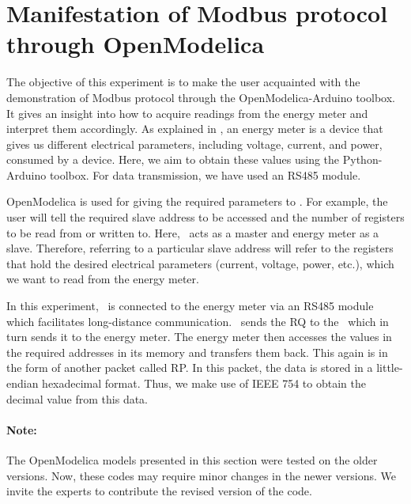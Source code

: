 
\section{Manifestation of Modbus protocol through OpenModelica}
The objective of this experiment is to make the user acquainted with
the demonstration of Modbus protocol through the OpenModelica-Arduino toolbox.
It gives an insight into how to acquire readings from the energy meter and interpret them accordingly. As explained in ,
an energy meter is a device that gives us different electrical parameters, including voltage, current, and power, consumed by a device. Here, we aim to obtain these values using the Python-Arduino toolbox. For data transmission, we have used an RS485 module.

OpenModelica is used for giving the required parameters to \arduino. For
example, the user will tell the required slave address to be accessed
and the number of registers to be read from or written to. Here,
\arduino\ acts as a master and energy meter as a slave. Therefore,
referring to a particular slave address will refer to the registers
that hold the desired electrical parameters (current, voltage, power, etc.), which we want to read from the energy meter.

In this experiment, \arduino\ is connected to the energy meter via an RS485 module which facilitates long-distance communication.
\scilab\ sends the RQ to the \arduino\, which in turn sends it to the
energy meter. The energy meter then accesses the values in the
required addresses in its memory and transfers them back. This again
is in the form of another packet called RP. In this packet, the data is stored in a little-endian hexadecimal format. Thus, we make use of IEEE 754 to obtain the decimal value from this data.

\paragraph{Note: } The OpenModelica models presented in this section were tested on the older versions. Now, these codes may require minor changes in
the newer versions. We invite the experts to contribute the revised version of the code.


